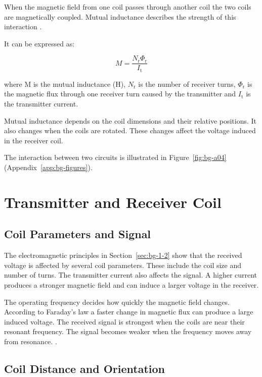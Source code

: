When the magnetic field from one coil passes through another coil the two coils are magnetically coupled. Mutual inductance describes the strength of 
this interaction \cite{sadiku2018elements}.

It can be expressed as:

\[
M = \frac{N_{\mathrm r}\Phi_{\mathrm r}}{I_{\mathrm t}}
\]

where M is the mutual inductance (H), \(N_{\mathrm r}\) is the number of receiver turns, \(\Phi_{\mathrm r}\) is the magnetic flux through one receiver 
turn caused by the transmitter and \(I_{\mathrm t}\) is the transmitter current.

Mutual inductance depends on the coil dimensions and their relative positions. It also changes when the coils are rotated. These changes affect the 
voltage induced in the receiver coil.

The interaction between two circuits is illustrated in Figure~\ref{fig:bg-a04} (Appendix~\ref{app:bg-figures}).





\section{Transmitter and Receiver Coil}\label{sec:bg-1-3}

\subsection{Coil Parameters and Signal}\label{sec:bg-1-3-1}

The electromagnetic principles in Section~\ref{sec:bg-1-2} show that the received voltage is affected by several coil parameters. These include the coil 
size and number of turns.
The transmitter current also affects the signal. A higher current produces a stronger magnetic field and can induce a larger voltage in the receiver.

The operating frequency decides how quickly the magnetic field changes. According to Faraday's law a faster change in magnetic flux can produce a large 
induced voltage. The received signal is strongest when the coils are near their resonant frequency. The signal becomes weaker when the frequency moves 
away from resonance. \cite{deangelis2015indoor,sadiku2018elements}.





\subsection{Coil Distance and Orientation} \label{sec:bg-1-3-2}

